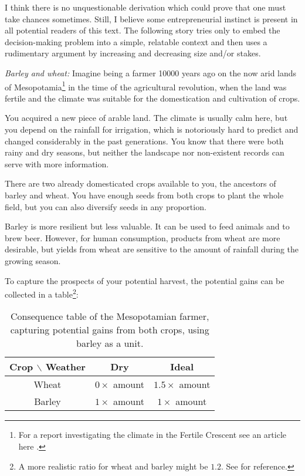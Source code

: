 \documentclass{article}
\begin{document}
I think there is no unquestionable derivation which could prove that one must take chances sometimes. Still, I believe some entrepreneurial instinct is present in all potential readers of this text. The following story tries only to embed the decision-making problem into a simple, relatable context and then uses a rudimentary argument by increasing and decreasing size and/or stakes.

{\it Barley and wheat:}
Imagine being a farmer 10000 years ago on the now arid lands of Mesopotamia\footnote {For a report investigating the climate in the Fertile Crescent see an article here \cite{article:ClimateCradleOfCivilization}.}
in the time of the agricultural revolution, when the land was fertile and the climate was suitable for the domestication and cultivation of crops.

You acquired a new piece of arable land. The climate is usually calm here, but you depend on the rainfall for irrigation, which is notoriously hard to predict and changed considerably in the past generations. You know that there were both rainy and dry seasons, but neither the landscape nor non-existent records can serve with more information. 

There are two already domesticated crops available to you, the ancestors of barley and wheat. You have enough seeds from both crops to plant the whole field, but you can also diversify seeds in any proportion.

Barley is more resilient but less valuable. It can be used to feed animals and to brew beer. However, for human consumption, products from wheat are more desirable, but yields from wheat are sensitive to the amount of rainfall during the growing season.

To capture the prospects of your potential harvest, the potential gains can be collected in a table\footnote{A more realistic ratio for wheat and barley might be $1.2$. See \cite{paper:ComparingPerCapitaIncomeMesopotamia} for reference.}:

\begin{table}[h!]
    \centering
    \begin{tabular}{c|cc}
        Crop $\backslash$ Weather & Dry & Ideal \\
        \hline
        Wheat & $0 \times$ amount & $1.5 \times$ amount \\
        Barley & $1 \times$ amount & $1 \times$ amount \\
    \end{tabular}
    \caption{Consequence table of the Mesopotamian farmer, capturing potential gains from both crops, using barley as a unit.}
    \label{tab:FarmersYields}
\end{table}
\end{document}
